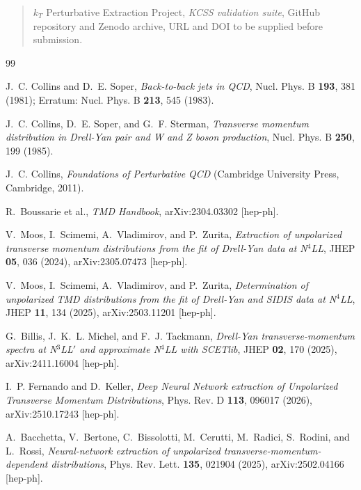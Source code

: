 \documentclass[aps,prd,preprint,superscriptaddress,nofootinbib,longbibliography]{revtex4-2}
\begin{document}
\begin{quote}
$k_T$ Perturbative Extraction Project, \emph{KCSS validation suite}, GitHub repository and Zenodo archive, URL and DOI to be supplied before submission.
\end{quote}

\begin{thebibliography}{99}

J.~C. Collins and D.~E. Soper,
\textit{Back-to-back jets in QCD},
Nucl. Phys. B \textbf{193}, 381 (1981);
Erratum: Nucl. Phys. B \textbf{213}, 545 (1983).

J.~C. Collins, D.~E. Soper, and G.~F. Sterman,
\textit{Transverse momentum distribution in Drell-Yan pair and W and Z boson production},
Nucl. Phys. B \textbf{250}, 199 (1985).

J.~C. Collins,
\textit{Foundations of Perturbative QCD}
(Cambridge University Press, Cambridge, 2011).

R.~Boussarie et al.,
\textit{TMD Handbook},
arXiv:2304.03302 [hep-ph].

V.~Moos, I.~Scimemi, A.~Vladimirov, and P.~Zurita,
\textit{Extraction of unpolarized transverse momentum distributions from the fit of Drell-Yan data at N$^4$LL},
JHEP \textbf{05}, 036 (2024),
arXiv:2305.07473 [hep-ph].

V.~Moos, I.~Scimemi, A.~Vladimirov, and P.~Zurita,
\textit{Determination of unpolarized TMD distributions from the fit of Drell-Yan and SIDIS data at N$^4$LL},
JHEP \textbf{11}, 134 (2025),
arXiv:2503.11201 [hep-ph].

G.~Billis, J.~K.~L. Michel, and F.~J. Tackmann,
\textit{Drell-Yan transverse-momentum spectra at N$^3$LL$'$ and approximate N$^4$LL with SCETlib},
JHEP \textbf{02}, 170 (2025),
arXiv:2411.16004 [hep-ph].

I.~P. Fernando and D.~Keller,
\textit{Deep Neural Network extraction of Unpolarized Transverse Momentum Distributions},
Phys. Rev. D \textbf{113}, 096017 (2026),
arXiv:2510.17243 [hep-ph].

A.~Bacchetta, V.~Bertone, C.~Bissolotti, M.~Cerutti, M.~Radici, S.~Rodini, and L.~Rossi,
\textit{Neural-network extraction of unpolarized transverse-momentum-dependent distributions},
Phys. Rev. Lett. \textbf{135}, 021904 (2025),
arXiv:2502.04166 [hep-ph].


\end{thebibliography}
\end{document}
